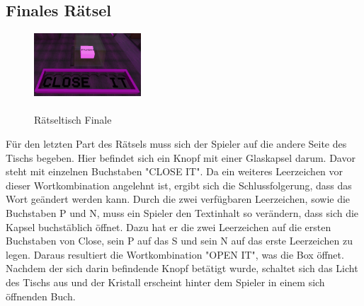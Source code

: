 \subsection{Finales Rätsel}
\begin{figure}
	\vspace*{-0.5cm}
	\includegraphics[width=4cm]{Pictures/Tisch4}
	\caption{\\ \noindent Rätseltisch Finale}
	\vspace*{-0.5cm}
	\label{fig:tisch4}
\end{figure}
Für den letzten Part des Rätsels muss sich der Spieler auf die andere Seite des Tischs begeben. Hier befindet sich ein Knopf mit einer Glaskapsel darum. Davor steht mit einzelnen Buchstaben "CLOSE  IT". Da ein weiteres Leerzeichen vor dieser Wortkombination angelehnt ist, ergibt sich die Schlussfolgerung, dass das Wort geändert werden kann. Durch die zwei verfügbaren Leerzeichen, sowie die Buchstaben P und N, muss ein Spieler den Textinhalt so verändern, dass sich die Kapsel buchstäblich öffnet. Dazu hat er die zwei Leerzeichen auf die ersten Buchstaben von Close, sein P auf das S und sein N auf das erste Leerzeichen zu legen. Daraus resultiert die Wortkombination "OPEN IT", was die Box öffnet. Nachdem der sich darin befindende Knopf betätigt wurde, schaltet sich das Licht des Tischs aus und der Kristall erscheint hinter dem Spieler in einem sich öffnenden Buch.

\newpage
\noindent
